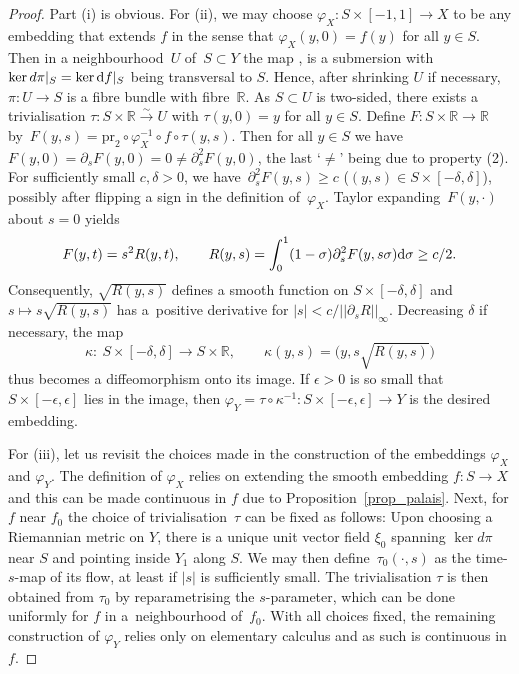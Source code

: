 \documentclass[pdftex]{sigma}
\numberwithin{equation}{section}
\theoremstyle{definition}
\newcommand{\R}{\mathbb{R}} %
\newcommand{\1}{{\bf 1}}
\begin{document}
\begin{proof}
Part (i) is obvious. For (ii), we may choose $\varphi_X\colon S\times [-1,1]\to X$ to be any embedding that extends $f$ in the sense that $\varphi_X(y,0)=f(y)$ for all $y\in S$.
Then in a neighbourhood~$U$ of~${S\subset Y}$ the map
,
is a submersion with $\ker d\pi|_S = \ker {\rm d}f|_S$ being transversal to $S$. Hence, after shrinking $U$ if necessary, $\pi\colon U\to S$ is a fibre bundle with fibre~$\R$. As $S\subset U$ is two-sided, there exists a trivialisation
$\tau\colon S\times \R \xrightarrow{\sim} U$
with $\tau(y,0)=y$ for all $y\in S$. Define $F\colon S\times \R\to \R$ by~${F(y,s) = \mathrm{pr}_2\circ \varphi_X^{-1}\circ f\circ\tau(y,s)}$. Then for all $y\in S$ we have~$F(y,0) = \partial_s F(y,0)=0 \neq \partial_s^2 F(y,0)$, the last `$\neq$' being due to property (2). For sufficiently small $c,\delta>0$, we have~$
	\partial_s^2 F(y,s) \ge c$ ($(y,s)\in S\times [-\delta,\delta]$),
possibly after flipping a sign in the definition of~$\varphi_X$.
Taylor expanding~$F(y,\cdot)$ about $s=0$ yields
\[
	F(y,t) = s^2 R(y,t),\qquad R(y,s) = \int_0^1(1-\sigma) \partial_{s}^2F(y,s\sigma) {\rm d}\sigma \ge c/2.
\]
Consequently, $\sqrt{R(y,s)}$ defines a smooth function on $S\times [-\delta,\delta]$ and $s\mapsto s \sqrt{R(y,s)}$ has a~positive derivative for $|s| < c/||\partial_s R||_{\infty}$. Decreasing $\delta$ if necessary, the map
\[
\kappa\colon\ S\times [-\delta,\delta]\to S\times \R,\qquad \kappa(y,s) = \bigl(y, s \sqrt{R(y,s)} \bigr)
\] thus becomes a diffeomorphism onto its image. If $\epsilon>0$ is so small that $S\times [-\epsilon,\epsilon]$ lies in the image, then $\varphi_Y = \tau\circ \kappa^{-1}\colon S\times [-\epsilon,\epsilon]\to Y$ is the desired embedding.

For (iii), let us revisit the choices made in the construction of the embeddings $\varphi_X$ and $\varphi_Y$. The definition of $\varphi_X$ relies on extending the smooth embedding $f\colon S\to X$ and this can be made continuous in $f$ due to Proposition~\ref{prop_palais}. Next, for $f$ near $f_0$ the choice of trivialisation~$\tau$
can be fixed as follows: Upon choosing a Riemannian metric on $Y$, there is a unique unit vector field $\xi_0$ spanning $\ker d\pi$ near $S$ and pointing inside $Y_1$ along $S$. We may then define~$\tau_0(\cdot,s)$ as the time-$s$-map of its flow, at least if $|s|$ is sufficiently small. The trivialisation $\tau$ is then obtained from $\tau_0$ by reparametrising the $s$-parameter, which can be done uniformly for $f$ in a~neighbourhood of~$f_0$. With all choices fixed, the remaining construction of $\varphi_Y$ relies only on elementary calculus and as such is continuous in $f$.


\end{proof}
\end{document}
